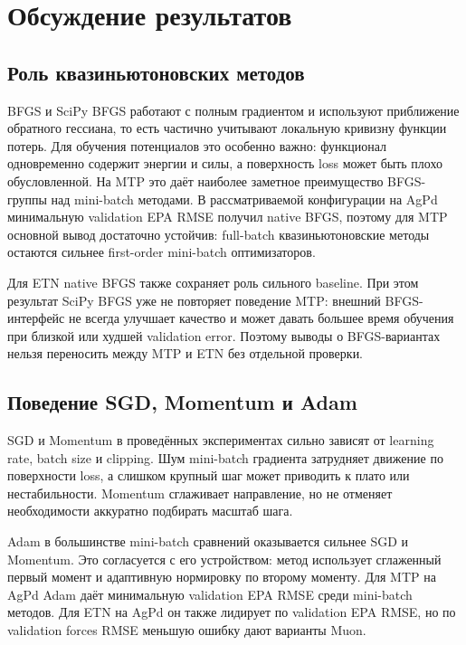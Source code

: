 \section{Обсуждение результатов}
\label{sec:discussion}

\subsection{Роль квазиньютоновских методов}

BFGS и SciPy BFGS работают с полным градиентом и используют приближение обратного гессиана, то есть частично учитывают локальную кривизну функции потерь. Для обучения потенциалов это особенно важно: функционал одновременно содержит энергии и силы, а поверхность loss может быть плохо обусловленной. На MTP это даёт наиболее заметное преимущество BFGS-группы над mini-batch методами. В рассматриваемой конфигурации на AgPd минимальную validation EPA RMSE получил native BFGS, поэтому для MTP основной вывод достаточно устойчив: full-batch квазиньютоновские методы остаются сильнее first-order mini-batch оптимизаторов.

Для ETN native BFGS также сохраняет роль сильного baseline. При этом результат SciPy BFGS уже не повторяет поведение MTP: внешний BFGS-интерфейс не всегда улучшает качество и может давать большее время обучения при близкой или худшей validation error. Поэтому выводы о BFGS-вариантах нельзя переносить между MTP и ETN без отдельной проверки.

\subsection{Поведение SGD, Momentum и Adam}

SGD и Momentum в проведённых экспериментах сильно зависят от learning rate, batch size и clipping. Шум mini-batch градиента затрудняет движение по поверхности loss, а слишком крупный шаг может приводить к плато или нестабильности. Momentum сглаживает направление, но не отменяет необходимости аккуратно подбирать масштаб шага.

Adam в большинстве mini-batch сравнений оказывается сильнее SGD и Momentum. Это согласуется с его устройством: метод использует сглаженный первый момент и адаптивную нормировку по второму моменту. Для MTP на AgPd Adam даёт минимальную validation EPA RMSE среди mini-batch методов. Для ETN на AgPd он также лидирует по validation EPA RMSE, но по validation forces RMSE меньшую ошибку дают варианты Muon.

